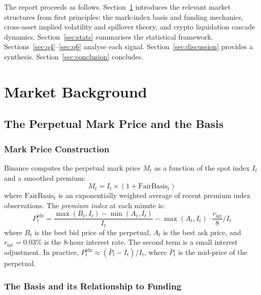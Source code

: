 \documentclass[12pt, a4paper]{article}
\theoremstyle{plain}
\theoremstyle{definition}
\begin{document}
The report proceeds as follows. Section~\ref{sec:market} introduces
the relevant market structures from first principles: the mark-index
basis and funding mechanics, cross-asset implied volatility and spillover
theory, and crypto liquidation cascade dynamics.
Section~\ref{sec:stats} summarises the statistical framework.
Sections~\ref{sec:q4}--\ref{sec:q6} analyse each signal.
Section~\ref{sec:discussion} provides a synthesis.
Section~\ref{sec:conclusion} concludes.

\section{Market Background}
\label{sec:market}

\subsection{The Perpetual Mark Price and the Basis}
\label{sec:basis_theory}

\subsubsection{Mark Price Construction}

Binance computes the perpetual mark price $M_t$ as a function of the
spot index $I_t$ and a smoothed premium:
\begin{equation}
  M_t = I_t \times \left(1 + \mathrm{FairBasis}_t\right)
  \label{eq:mark}
\end{equation}
where $\mathrm{FairBasis}_t$ is an exponentially weighted average of
recent premium index observations.  The \emph{premium index} at each
minute is:
\begin{equation}
  P_t^{\text{idx}} = \frac{\max(B_t, I_t) - \min(A_t, I_t)}{I_t}
  - \max(A_t, I_t) \cdot \frac{r_{\text{int}}}{8} / I_t
  \label{eq:premidx}
\end{equation}
where $B_t$ is the best bid price of the perpetual, $A_t$ is the best
ask price, and $r_{\text{int}} = 0.03\%$ is the 8-hour interest rate.
The second term is a small interest adjustment.  In practice,
$P_t^{\text{idx}} \approx (\bar{P}_t - I_t) / I_t$, where $\bar{P}_t$
is the mid-price of the perpetual.

\subsubsection{The Basis and its Relationship to Funding}
\end{document}
